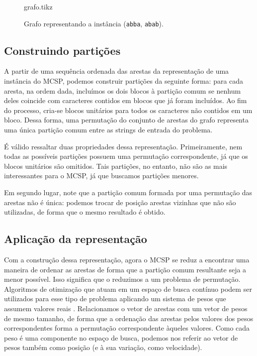 \begin{figure}
    \centering
    {grafo.tikz}

    \caption{Grafo representando a instância (\texttt{abba}, \texttt{abab}).}
    \label{fig:grafo}
\end{figure}

\subsection{Construindo partições} \label{sec:construindo-particoes}

    A partir de uma sequência ordenada das arestas da representação de uma instância do MCSP, podemos construir partições da seguinte forma: para cada aresta, na ordem dada, incluímos os dois blocos à partição comum se nenhum deles coincide com caracteres contidos em blocos que já foram incluídos. Ao fim do processo, cria-se blocos unitários para todos os caracteres não contidos em um bloco. Dessa forma, uma permutação do conjunto de arestas do grafo representa uma única partição comum entre as strings de entrada do problema.

    É válido ressaltar duas propriedades dessa representação. Primeiramente, nem todas as possíveis partições possuem uma permutação correspondente, já que os blocos unitários são omitidos. Tais partições, no entanto, não são as mais interessantes para o MCSP, já que buscamos partições menores.

    Em segundo lugar, note que a partição comum formada por uma permutação das arestas não é única: podemos trocar de posição arestas vizinhas que não são utilizadas, de forma que o mesmo resultado é obtido.

\subsection{Aplicação da representação}

    Com a construção dessa representação, agora o MCSP se reduz a encontrar uma maneira de ordenar as arestas de forma que a partição comum resultante seja a menor possível. Isso significa que o reduzimos a um problema de permutação. Algoritmos de otimização que atuam em um espaço de busca contínuo podem ser utilizados para esse tipo de problema aplicando um sistema de pesos que assumem valores reais \cite[p.~661]{marti_handbook_2018}. Relacionamos o vetor de arestas com um vetor de pesos de mesmo tamanho, de forma que a ordenação das arestas pelos valores dos pesos correspondentes forma a permutação correspondente àqueles valores. Como cada peso é uma componente no espaço de busca, podemos nos referir ao vetor de pesos também como posição (e à sua variação, como velocidade).
